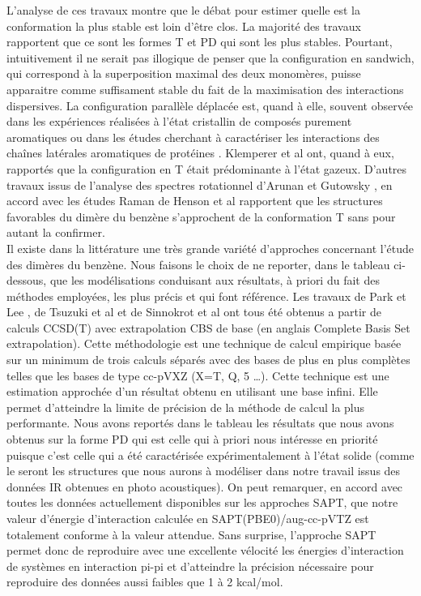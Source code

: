    					L’analyse de ces travaux montre que le débat pour estimer quelle est la conformation la plus stable est loin d’être clos. La majorité des travaux rapportent que ce sont les formes T et PD qui sont les plus stables. Pourtant, intuitivement il ne serait pas illogique de penser que la configuration en sandwich, qui correspond à la superposition maximal des deux monomères, puisse apparaitre comme suffisament stable du fait de la maximisation des interactions dispersives. La configuration parallèle déplacée est, quand à elle, souvent observée dans les expériences réalisées à l’état cristallin de composés purement aromatiques \cite{hunter1991pi,fyfe1997synthetic,rebek1996assembly} ou dans les études cherchant à caractériser les interactions des chaînes latérales aromatiques de protéines \cite{hunter1991pi,burley1985aromatic}.
   					Klemperer et al \cite{janda1975benzene} ont, quand à eux, rapportés que la configuration en T était prédominante à l’état gazeux. D’autres travaux issus de l’analyse des spectres rotationnel d'Arunan et Gutowsky \cite{arunan1993rotational}, en accord avec les études Raman de Henson et al \cite{henson1992raman} rapportent que les structures favorables du dimère du benzène s’approchent de la conformation T sans pour autant la confirmer.\\ 
   					
   					
   					Il existe dans la littérature une très grande variété d’approches concernant l’étude des dimères du benzène.
   					Nous faisons le choix de ne reporter, dans le tableau ci-dessous, que les modélisations conduisant aux résultats, à priori du fait des méthodes employées, les plus précis et qui font référence. Les travaux de Park et Lee \cite{park2006accurate}, de Tsuzuki et al \cite{tsuzuki2002origin} et de Sinnokrot et al \cite{hobza1996potential} ont tous été obtenus a partir de calculs CCSD(T) avec extrapolation CBS de base (en anglais Complete Basis Set extrapolation).
   					Cette méthodologie est une technique de calcul empirique basée sur un minimum de trois calculs séparés avec des bases de plus en plus complètes telles que les bases de type cc-pVXZ (X=T, Q, 5 …). 
   					Cette technique est une estimation approchée d’un résultat obtenu en utilisant une base infini. Elle permet d’atteindre la limite
   					de précision de la méthode de calcul la plus performante.
   					Nous avons reportés dans le tableau les résultats que nous avons obtenus sur la forme PD qui est celle qui à priori nous intéresse en priorité puisque c’est celle qui a été caractérisée expérimentalement à l’état solide (comme le seront les structures que nous aurons à modéliser dans notre travail issus des données IR obtenues en photo acoustiques). On peut remarquer, en accord avec toutes les données actuellement disponibles sur les approches SAPT, que notre valeur d’énergie d’interaction calculée en SAPT(PBE0)/aug-cc-pVTZ est totalement conforme à la valeur attendue. Sans surprise, l’approche SAPT
   					permet donc de reproduire avec une excellente vélocité les énergies d’interaction de systèmes en interaction pi-pi et d’atteindre la précision nécessaire pour reproduire des données aussi faibles que 1 à 2 kcal/mol. 
   					

